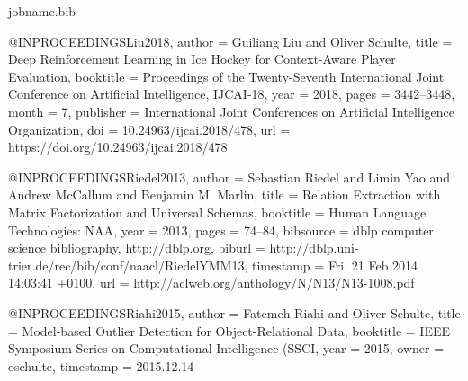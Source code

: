 {%
%	

\begin{filecontents*}{jobname.bib}
	
	@INPROCEEDINGS{Liu2018,
  author = {Guiliang Liu and Oliver Schulte},
  title = {Deep Reinforcement Learning in Ice Hockey for Context-Aware Player
	Evaluation},
  booktitle = {Proceedings of the Twenty-Seventh International Joint Conference
	on Artificial Intelligence, {IJCAI-18}},
  year = {2018},
  pages = {3442--3448},
  month = {7},
  publisher = {International Joint Conferences on Artificial Intelligence Organization},
  doi = {10.24963/ijcai.2018/478},
  url = {https://doi.org/10.24963/ijcai.2018/478}
}

	@INPROCEEDINGS{Riedel2013,
		author = {Sebastian Riedel and Limin Yao and Andrew McCallum and Benjamin M.
			Marlin},
		title = {Relation Extraction with Matrix Factorization and Universal Schemas},
		booktitle = {Human Language Technologies: NAA},
		year = {2013},
		pages = {74--84},
		bibsource = {dblp computer science bibliography, http://dblp.org},
		biburl = {http://dblp.uni-trier.de/rec/bib/conf/naacl/RiedelYMM13},
		timestamp = {Fri, 21 Feb 2014 14:03:41 +0100},
		url = {http://aclweb.org/anthology/N/N13/N13-1008.pdf}
	}
	
	
	@INPROCEEDINGS{Riahi2015,
		author = {Fatemeh Riahi and Oliver Schulte},
		title = {Model-based Outlier Detection for Object-Relational Data},
		booktitle = {IEEE Symposium Series on Computational Intelligence (SSCI},
		year = {2015},
		owner = {oschulte},
		timestamp = {2015.12.14}
	}
	

\end{filecontents*}}
